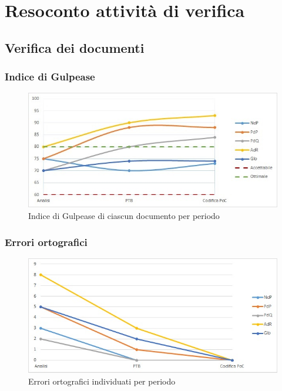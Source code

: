\appendix
\section{Resoconto attività di verifica}\label{section:resoconto_verifica}
\subsection{Verifica dei documenti}\label{subsection:verifica_documenti}
\subsubsection{Indice di Gulpease}
\begin{figure}[H]
  \centering
  \includegraphics[scale=0.8]{immagini/gulpease.jpg}
  \caption{Indice di Gulpease di ciascun documento per periodo}
\end{figure}

\subsubsection{Errori ortografici}
\begin{figure}[H]
  \centering
  \includegraphics[scale=0.8]{immagini/err_ortografici.jpg}
  \caption{Errori ortografici individuati per periodo}
\end{figure}

